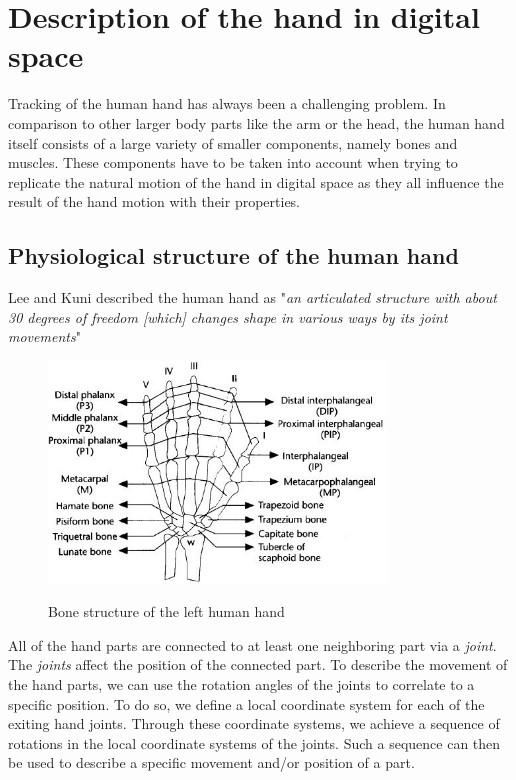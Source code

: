\chapter{Description of the hand in digital space}
\label{sec:Description_of_hand_in_digital_space}
Tracking of the human hand has always been a challenging problem. In comparison to other larger body parts like the arm or the head, the human hand itself consists of a large variety of smaller components, namely bones and muscles. These components have to be taken into account when trying to replicate the natural motion of the hand in digital space as they all influence the result of the hand motion with their properties.
\section{Physiological structure of the human hand}
\label{sec:Physiological_structure_of_the_human_hand}
Lee and Kuni \citep{LEE.1995} described the human hand as "\textit{an articulated structure with about 30 degrees of freedom [which] changes shape in various ways by its joint movements}"
\begin{figure}[H]
	\centering
	\includegraphics[width=0.8\textwidth]{images/hand.jpg}
	\label{Handstructure} 
	\caption{Bone structure of the left human hand \cite{LEE.1995}}
\end{figure}
All of the hand parts are connected to at least one neighboring part via a \textit{joint}. The \textit{joints} affect the position of the connected part. To describe the movement of the hand parts, we can use the rotation angles of the joints to correlate to a specific position.
To do so, we define a local coordinate system for each of the exiting hand joints. Through these coordinate systems, we achieve a sequence of rotations in the local coordinate systems of the joints. Such a sequence can then be used to describe a specific movement and/or position of a part.
